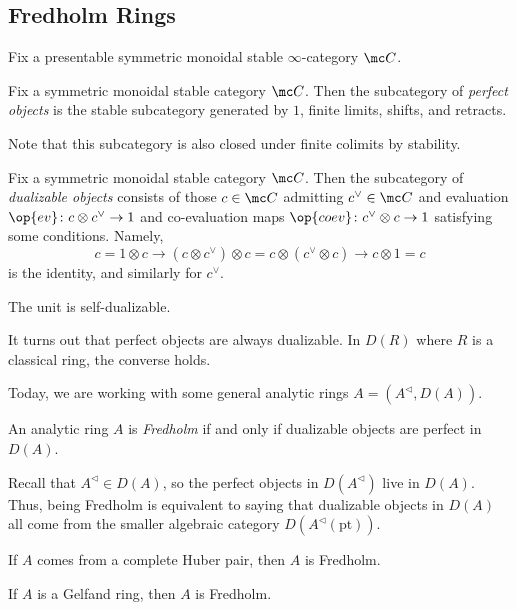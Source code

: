 \documentclass{article}
\begin{document}
\subsection{Fredholm Rings}
Fix a presentable symmetric monoidal stable $\infty$-category $\mc C$.
\begin{definition}
	Fix a symmetric monoidal stable category $\mc C$. Then the subcategory of \textit{perfect objects} is the stable subcategory generated by $1$, finite limits, shifts, and retracts.
\end{definition}
\begin{remark}
	Note that this subcategory is also closed under finite colimits by stability.
\end{remark}
\begin{definition}
	Fix a symmetric monoidal stable category $\mc C$. Then the subcategory of \textit{dualizable objects} consists of those $c\in\mc C$ admitting $c^\lor\in\mc C$ and evaluation $\op{ev}\colon c\otimes c^\lor\to1$ and co-evaluation maps $\op{coev}\colon c^\lor\otimes c\to1$ satisfying some conditions. Namely,
	\[c=1\otimes c\to (c\otimes c^\lor)\otimes c=c\otimes (c^\lor\otimes c)\to c\otimes1=c\]
	is the identity, and similarly for $c^\lor$.
\end{definition}
\begin{example}
	The unit is self-dualizable.
\end{example}
\begin{remark}
	It turns out that perfect objects are always dualizable. In $D(R)$ where $R$ is a classical ring, the converse holds.
\end{remark}
Today, we are working with some general analytic rings $A=\left(A^\vartriangleleft,D(A)\right)$.
\begin{definition}
	An analytic ring $A$ is \textit{Fredholm} if and only if dualizable objects are perfect in $D(A)$.
\end{definition}
\begin{remark}
	Recall that $A^\vartriangleleft\in D(A)$, so the perfect objects in $D(A^\vartriangleleft)$ live in $D(A)$. Thus, being Fredholm is equivalent to saying that dualizable objects in $D(A)$ all come from the smaller algebraic category $D(A^\vartriangleleft(\mathrm{pt}))$.
\end{remark}
\begin{example}
	If $A$ comes from a complete Huber pair, then $A$ is Fredholm.
\end{example}
\begin{example}
	If $A$ is a Gelfand ring, then $A$ is Fredholm.
\end{example}
\end{document}
